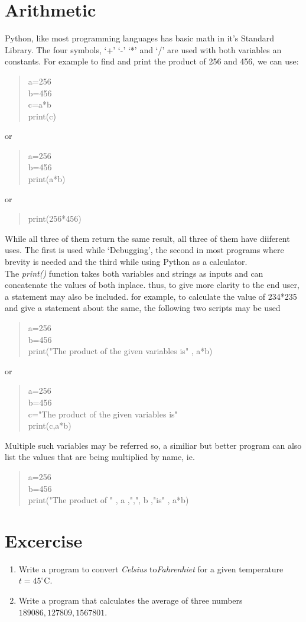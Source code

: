 \section{Arithmetic}
Python, like most programming languages has basic math in it's Standard Library. The four symbols, `+' `-' `*' and `/' are used with both variables an constants.
\newpage For example to find and print the product of 256 and 456, we can use:
\begin{quote}
a=256\\b=456\\c=a*b\\print(c)
\end{quote}
or
\begin{quote}
a=256\\b=456\\print(a*b)
\end{quote}
or
\begin{quote}
print(256*456)
\end{quote}
While all three of them return the same result, all three of them have diiferent uses. The first is used while `Debugging', the second in most programs where brevity is needed and the third while using Python as a calculator.\\
The  \emph{print()} function takes both variables and strings as inputs and can concatenate the values of both inplace. thus, to give more clarity to the end user, a statement may also be included. for example, to calculate the value of 234*235 and give a statement about the same, the following two scripts may be used
\begin{quote}
a=256\\b=456\\print("The product of the given variables is" ,  a*b)
\end{quote}
or
\begin{quote}
a=256\\b=456\\c="The product of the given variables is"  \\print(c,a*b)
\end{quote}
Multiple such variables may be referred so, a similiar but better program can also list the values that are being multiplied by name, ie.  
\begin{quote}
a=256\\b=456\\print("The product of " , a ,",", b ,"is" ,  a*b)
\end{quote}
\section{Excercise}
\begin{enumerate}
\item Write a program to convert \emph{Celsius} to\emph{Fahrenhiet} for a given temperature $t=45^{\circ}$C.
\item Write a program that calculates the average of three numbers $189086,127809,1567801$.
\end{enumerate}

